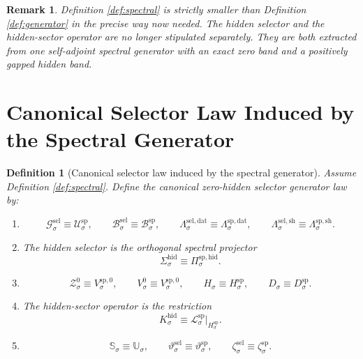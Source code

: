 \documentclass[11pt]{article}
\newcommand{\GapSpace}[1]{H_{#1}}
\newcommand{\GapBody}[1]{D_{#1}}
\newcommand{\HiddenOperator}[1]{K_{#1}^{\mathrm{hid}}}
\newcommand{\GenSpace}[1]{\mathcal G_{#1}^{\mathrm{sel}}}
\newcommand{\GenBody}[1]{\mathcal B_{#1}^{\mathrm{sel}}}
\newcommand{\GenData}[1]{\Lambda_{#1}^{\mathrm{sel,dat}}}
\newcommand{\GenShell}[1]{\Lambda_{#1}^{\mathrm{sel,sh}}}
\newcommand{\HiddenSel}[1]{\Sigma_{#1}^{\mathrm{hid}}}
\newcommand{\ZeroHiddenSlice}[1]{\mathcal Z_{#1}^{0}}
\newcommand{\ZeroHiddenVec}[1]{V_{#1}^{0}}
\newcommand{\GenSym}[1]{\mathbb S_{#1}}
\newcommand{\GenTime}[1]{\vartheta_{#1}^{\mathrm{sel}}}
\newcommand{\GenEmbed}[1]{\zeta_{#1}^{\mathrm{sel}}}
\newcommand{\SpecSpace}[1]{\mathcal U_{#1}^{\mathrm{sp}}}
\newcommand{\SpecBody}[1]{\mathcal B_{#1}^{\mathrm{sp}}}
\newcommand{\SpecData}[1]{\Lambda_{#1}^{\mathrm{sp,dat}}}
\newcommand{\SpecShell}[1]{\Lambda_{#1}^{\mathrm{sp,sh}}}
\newcommand{\SpecOp}[1]{\mathcal L_{#1}^{\mathrm{sp}}}
\newcommand{\SpecZero}[1]{V_{#1}^{\mathrm{sp},0}}
\newcommand{\SpecHidden}[1]{H_{#1}^{\mathrm{sp}}}
\newcommand{\SpecHiddenBody}[1]{D_{#1}^{\mathrm{sp}}}
\newcommand{\SpecProj}[1]{\Pi_{#1}^{\mathrm{sp,hid}}}
\newcommand{\SpecSym}[1]{\mathbb U_{#1}}
\newcommand{\SpecTime}[1]{\vartheta_{#1}^{\mathrm{sp}}}
\newcommand{\SpecEmbed}[1]{\zeta_{#1}^{\mathrm{sp}}}
\newtheorem{definition}{Definition}
\newtheorem{remark}{Remark}
\begin{document}
\begin{remark}
Definition \ref{def:spectral} is strictly smaller than Definition \ref{def:generator} in the precise way now needed. The hidden selector and the hidden-sector operator are no longer stipulated separately. They are both extracted from one self-adjoint spectral generator with an exact zero band and a positively gapped hidden band.
\end{remark}

\section{Canonical Selector Law Induced by the Spectral Generator}

\begin{definition}[Canonical selector law induced by the spectral generator]
\label{def:canonical}
Assume Definition \ref{def:spectral}. Define the canonical zero-hidden selector generator law by:
\begin{enumerate}
    \item
    \[
    \GenSpace{\sigma}\equiv\SpecSpace{\sigma},
    \qquad
    \GenBody{\sigma}\equiv\SpecBody{\sigma},
    \qquad
    \GenData{\sigma}\equiv\SpecData{\sigma},
    \qquad
    \GenShell{\sigma}\equiv\SpecShell{\sigma}.
    \]
    \item The hidden selector is the orthogonal spectral projector
    \begin{equation}
    \HiddenSel{\sigma}\equiv\SpecProj{\sigma}.
    \label{eq:selectorproj}
    \end{equation}
    \item
    \[
    \ZeroHiddenSlice{\sigma}\equiv\SpecZero{\sigma},
    \qquad
    \ZeroHiddenVec{\sigma}\equiv\SpecZero{\sigma},
    \qquad
    \GapSpace{\sigma}\equiv\SpecHidden{\sigma},
    \qquad
    \GapBody{\sigma}\equiv\SpecHiddenBody{\sigma}.
    \]
    \item The hidden-sector operator is the restriction
    \begin{equation}
    \HiddenOperator{\sigma}
    \equiv
    \SpecOp{\sigma}\big|_{\SpecHidden{\sigma}}.
    \label{eq:hiddenrestriction}
    \end{equation}
    \item
    \[
    \GenSym{\sigma}\equiv\SpecSym{\sigma},
    \qquad
    \GenTime{\sigma}\equiv\SpecTime{\sigma},
    \qquad
    \GenEmbed{\sigma}\equiv\SpecEmbed{\sigma}.
    \]
\end{enumerate}
\end{definition}
\end{document}
